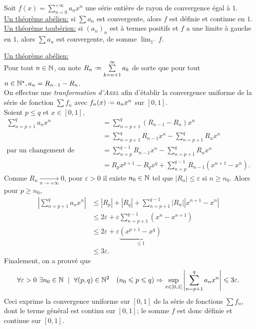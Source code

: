 \begin{theo}

Soit $f(x) = \sum\limits_{n=0}^{+\infty} a_n x^n$ une série entière de rayon de convergence égal à $1$. \\
\underline{Un théorème abélien:} si $\sum a_n$ est convergente, alors $f$ est définie et continue en $1$. \\
\underline{Un théorème taubérien:} si $(a_n)_n$ est à termes positifs et $f$ a une limite à gauche en $1$, alors $\sum a_n$ est convergente, de somme $\displaystyle \lim_{1^-}f$.
\end{theo}

\begin{preuve} 
    \underline{Un théorème abélien:} \\
    Pour tout $n \in \mathbb{N}$, on note $R_n \defeq \sum\limits_{k = n+1}^{\infty} a_k$ de sorte que pour tout $n \in \mathbb{N}^\star, a_n = R_{n-1} - R_n$. \\
    On effectue une \emph{tranformation d'\textsc{Abel}} afin d'établir la convergence uniforme de la série de fonction $\sum f_n$ avec $f_n(x) \defeq a_n x^n$ sur $[0, 1]$. \\
    Soient $p \leqslant q$ et $x \in [0,1]$,
    \begin{align*}
        \sum_{n=p+1}^q a_n x^n &= \sum_{n=p+1}^q (R_{n-1} -R_n) x^n \\
        &= \sum_{n=p+1}^q R_{n-1} x^n - \sum_{n=p+1}^q R_n x^n \\
    \text{par un changement de variable} &= \sum_{n=p}^{q-1} R_{n-1} x^n - \sum_{n=p+1}^q R_n x^n \\
    &= R_px^{p+1} - R_q x^q + \sum_{n=p}^{q-1} R_{n-1} (x^{n+1}-x^n).
    \end{align*}
    Comme $R_n \xrightarrow[n \to +\infty]{}0$, pour $\varepsilon > 0$ il existe $n_0 \in \mathbb{N}$ tel que $|R_n| \leqslant \varepsilon$ si $n \geqslant n_0$. Alors pour $p \geqslant n_0$, 
    \begin{align*}
        \left| \sum_{n=p+1}^q a_n x^n \right| &\leqslant |R_p| + |R_q| + \sum_{n=p+1}^{q-1} |R_n||x^{n+1}-x^n| \\
        &\leqslant 2 \varepsilon + \varepsilon \sum_{n=p+1}^{q-1} (x^n-x^{n+1}) \\
        &\leqslant 2 \varepsilon + \varepsilon \underbrace{(x^{p+1}-x^q)}_{\leqslant 1} \\
        &\leqslant 3 \varepsilon.
    \end{align*}
    Finalement, on a prouvé que
    $$\forall \varepsilon > 0\ \exists n_0 \in \mathbb{N}\ \mid\ \forall(p,q) \in \mathbb{N}^2 \quad (n_0 \leqslant p \leqslant q) \Rightarrow \sup_{x \in [0, 1]} \left| \sum_{n=p+1}^q a_n x^n \right| \leqslant 3 \varepsilon.$$
    Ceci exprime la convergence uniforme sur $[0, 1]$ de la série de fonctions $\sum f_n$, dont le terme général est continu sur $[0,1]$; le somme $f$ est donc définie et continue sur $[0, 1]$.
\end{preuve}
